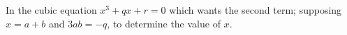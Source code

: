 In the cubic equation $x^3 + qx + r = 0$
which wants the second term; supposing
$x = a+b$ and $3ab = -q$, to determine
the value of $x$.
